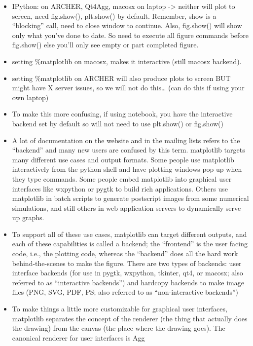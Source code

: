 \documentclass{article}
\begin{document}
\begin{itemize}
\item
  IPython: on ARCHER, Qt4Agg, macosx on laptop -\textgreater{} neither
  will plot to screen, need fig.show(), plt.show() by default. Remember,
  show is a ``blocking'' call, need to close window to continue. Also,
  fig.show() will show only what you've done to date. So need to execute
  all figure commands before fig.show() else you'll only see empty or
  part completed figure.
\item
  setting \%matplotlib on macosx, makes it interactive (still macosx
  backend).
\item
  setting \%matplotlib on ARCHER will also produce plots to screen BUT
  might have X server issues, so we will not do this\ldots{} (can do
  this if using your own laptop)
\item
  To make this more confusing, if using notebook, you have the
  interactive backend set by default so will not need to use plt.show()
  or fig.show()
\item
  A lot of documentation on the website and in the mailing lists refers
  to the ``backend'' and many new users are confused by this term.
  matplotlib targets many different use cases and output formats. Some
  people use matplotlib interactively from the python shell and have
  plotting windows pop up when they type commands. Some people embed
  matplotlib into graphical user interfaces like wxpython or pygtk to
  build rich applications. Others use matplotlib in batch scripts to
  generate postscript images from some numerical simulations, and still
  others in web application servers to dynamically serve up graphs.
\item
  To support all of these use cases, matplotlib can target different
  outputs, and each of these capabilities is called a backend; the
  ``frontend'' is the user facing code, i.e., the plotting code, whereas
  the ``backend'' does all the hard work behind-the-scenes to make the
  figure. There are two types of backends: user interface backends (for
  use in pygtk, wxpython, tkinter, qt4, or macosx; also referred to as
  ``interactive backends'') and hardcopy backends to make image files
  (PNG, SVG, PDF, PS; also referred to as ``non-interactive backends'')
\item
  To make things a little more customizable for graphical user
  interfaces, matplotlib separates the concept of the renderer (the
  thing that actually does the drawing) from the canvas (the place where
  the drawing goes). The canonical renderer for user interfaces is Agg

\end{itemize}
\end{document}
